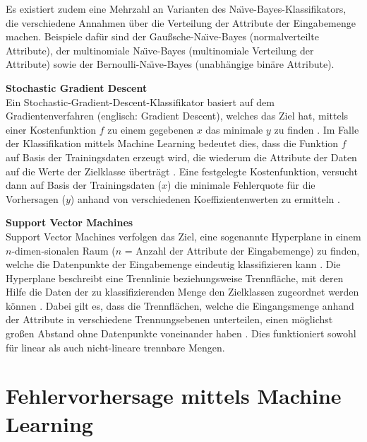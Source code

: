 Es existiert zudem eine Mehrzahl an Varianten des Na\"{\i}ve-Bayes-Klassifikators, die verschiedene Annahmen über die Verteilung der Attribute der Eingabemenge machen. Beispiele dafür sind der Gaußsche-Na\"{\i}ve-Bayes (normalverteilte Attribute), der multinomiale Na\"{\i}ve-Bayes (multinomiale Verteilung der Attribute) sowie der Bernoulli-Na\"{\i}ve-Bayes (unabhängige binäre Attribute).

\textbf{Stochastic Gradient Descent\medskip}\\
Ein Stochastic-Gradient-Descent-Klassifikator basiert auf dem Gradientenverfahren (englisch: Gradient Descent), welches das Ziel hat, mittels einer Kostenfunktion $f$ zu einem gegebenen $x$ das minimale $y$ zu finden \cite{Srinivasan2019}. Im Falle der Klassifikation mittels Machine Learning bedeutet dies, dass die Funktion $f$ auf Basis der Trainingsdaten erzeugt wird, die wiederum die Attribute der Daten auf die Werte der Zielklasse überträgt \cite{Diab2019}. Eine festgelegte Kostenfunktion, versucht dann auf Basis der Trainingsdaten ($x$) die minimale Fehlerquote für die Vorhersagen ($y$) anhand von verschiedenen Koeffizientenwerten zu ermitteln \cite{Diab2019}.

\textbf{Support Vector Machines\medskip}\\
Support Vector Machines verfolgen das Ziel, eine sogenannte \glqq Hyperplane\grqq{} in einem $n$-dimen-sionalen Raum ($n$ = Anzahl der Attribute der Eingabemenge) zu finden, welche die Datenpunkte der Eingabemenge eindeutig klassifizieren kann \cite{Gandhi2018}. Die Hyperplane beschreibt eine Trennlinie beziehungsweise Trennfläche, mit deren Hilfe die Daten der zu klassifizierenden Menge den Zielklassen zugeordnet werden können \cite{Luber2019}. Dabei gilt es, dass die Trennflächen, welche die Eingangsmenge anhand der Attribute in verschiedene Trennungsebenen unterteilen, einen möglichst großen Abstand ohne Datenpunkte voneinander haben \cite{Luber2019}. Dies funktioniert sowohl für linear als auch nicht-lineare trennbare Mengen.

\section{Fehlervorhersage mittels Machine Learning}

